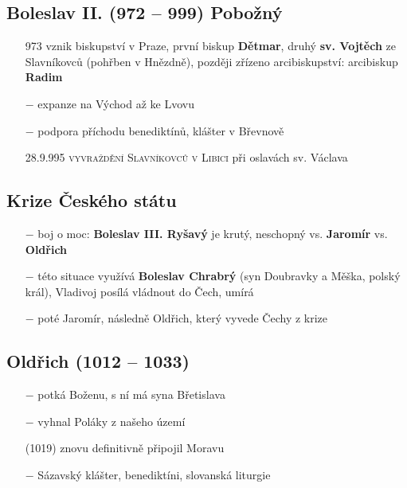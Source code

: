 \documentclass{article}
\begin{document}
\subsection*{Boleslav II. (972 -- 999) Pobožný}
\begin{itemize}
    \vspace{-0.5em}
    \setlength\itemsep{0.15em}
    \item[973] vznik biskupství v Praze, první biskup \textbf{Dětmar}, druhý \textbf{sv. Vojtěch} ze Slavníkovců (pohřben v Hnězdně), později zřízeno arcibiskupství: arcibiskup \textbf{Radim}
    \item[$-$] expanze na Východ až ke Lvovu
    \item[$-$] podpora příchodu benediktínů, klášter v Břevnově
    \item[28.9.995] \textsc{vyvraždění Slavníkovců v Libici} při oslavách sv. Václava
\end{itemize}

\subsection*{Krize Českého státu}
\begin{itemize}
    \vspace{-0.5em}
    \setlength\itemsep{0.15em}
    \item[$-$] boj o moc: \textbf{Boleslav III. Ryšavý} je krutý, neschopný vs. \textbf{Jaromír} vs. \textbf{Oldřich}
    \item[$-$] této situace využívá \textbf{Boleslav Chrabrý} (syn Doubravky a Měška, polský král), Vladivoj posílá vládnout do Čech, umírá
    \item[$-$] poté Jaromír, následně Oldřich, který vyvede Čechy z krize
\end{itemize}

\subsection*{Oldřich (1012 -- 1033)}
\begin{itemize}
    \vspace{-0.5em}
    \setlength\itemsep{0.15em}
    \item[$-$] potká Boženu, s ní má syna Břetislava
    \item[$-$] vyhnal Poláky z našeho území
    \item[(1019)] znovu definitivně připojil Moravu
    \item[$-$] Sázavský klášter, benediktíni, slovanská liturgie
\end{itemize}
\end{document}
